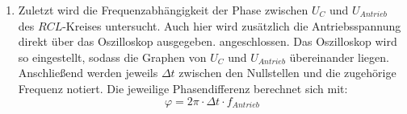 \begin{enumerate}
         \item Zuletzt wird die Frequenzabhängigkeit der Phase zwischen $U_C$ und $U_{Antrieb}$ des
          $RCL$-Kreises untersucht. Auch hier wird zusätzlich die Antriebsspannung direkt über das Oszilloskop ausgegeben.
          angeschlossen. Das Oszilloskop wird so eingestellt, sodass die Graphen von $U_C$ und $U_{Antrieb}$ übereinander liegen.
             Anschließend werden jeweils
      $\Delta t$ zwischen den Nullstellen und die zugehörige Frequenz notiert. Die jeweilige
       Phasendifferenz berechnet sich mit:
       \begin{equation}
         \varphi = 2 \pi \cdot \Delta t \cdot f_{Antrieb}
       \end{equation}
\end{enumerate}
